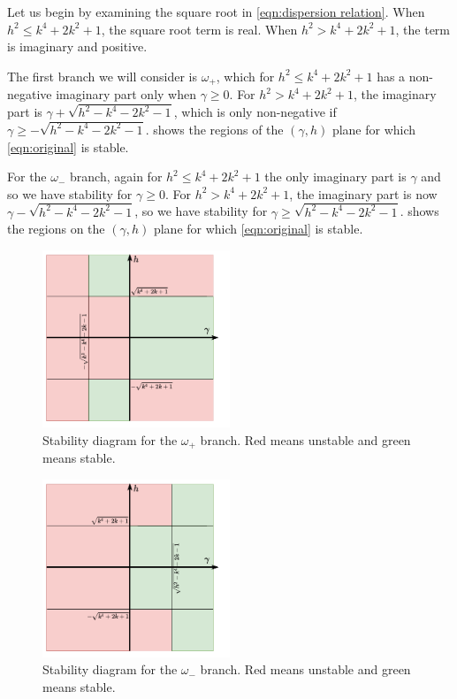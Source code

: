 \documentclass[11pt]{article}
\numberwithin{equation}{section}
\numberwithin{figure}{section}
\numberwithin{table}{section}
\begin{document}
\par Let us begin by examining the square root in \cref{eqn:dispersion relation}. When $h^2\leq k^4+2k^2+1$, the square root term is real. When $h^2>k^4+2k^2+1$, the term is imaginary and positive.
\par The first branch we will consider is $\omega_+$, which for $h^2\leq k^4+2k^2+1$ has a non-negative imaginary part only when $\gamma\geq0$. For $h^2>k^4+2k^2+1$, the imaginary part is $\gamma+\sqrt{h^2-k^4-2k^2-1}$, which is only non-negative if $\gamma\geq-\sqrt{h^2-k^4-2k^2-1}$.  shows the regions of the $(\gamma, h)$ plane for which \cref{eqn:original} is stable.
\par For the $\omega_-$ branch, again for $h^2\leq k^4+2k^2+1$ the only imaginary part is $\gamma$ and so we have stability for $\gamma\geq0$. For $h^2>k^4+2k^2+1$, the imaginary part is now $\gamma-\sqrt{h^2-k^4-2k^2-1}$, so we have stability for $\gamma\geq\sqrt{h^2-k^4-2k^2-1}$.  shows the regions on the $(\gamma, h)$ plane for which \cref{eqn:original} is stable.

\begin{figure}[H]
    \begin{center}
        \includegraphics[width=0.5\textwidth]{Plots/stabilityPlus.pdf}
        \caption{Stability diagram for the $\omega_+$ branch. Red means unstable and green means stable.}
        \label{fig:stabilityPlus}
    \end{center}
\end{figure}
\begin{figure}[H]
    \begin{center}
        \includegraphics[width=0.5\textwidth]{Plots/stabilityMinus.pdf}
        \caption{Stability diagram for the $\omega_-$ branch. Red means unstable and green means stable.}
        \label{fig:stabilityMinus}
    \end{center}
\end{figure}
\end{document}
